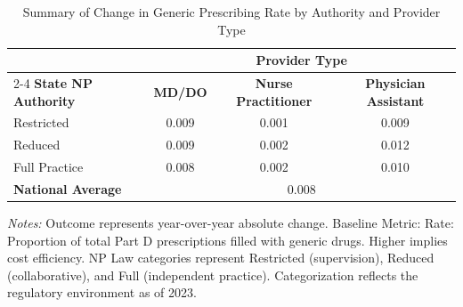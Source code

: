 \begin{table}[htbp]
    \centering
    \caption{Summary of Change in Generic Prescribing Rate by Authority and Provider Type}
    \label{tab:d_partd_generic_rate}
    \vspace{0.2cm}
    \begin{tabular}{lccc}
        \toprule
        & \multicolumn{3}{c}{\textbf{Provider Type}} \\
        \cmidrule(lr){2-4}
        \textbf{State NP Authority} & \textbf{MD/DO} & \textbf{Nurse Practitioner} & \textbf{Physician Assistant} \\
        \midrule
        Restricted & 0.009 & 0.001 & 0.009 \\
        Reduced & 0.009 & 0.002 & 0.012 \\
        Full Practice & 0.008 & 0.002 & 0.010 \\
        \midrule
        \textbf{National Average} & \multicolumn{3}{c}{0.008} \\
        \bottomrule
    \end{tabular}
    \vspace{0.1cm}
    \begin{minipage}{0.85\textwidth}
        \footnotesize \textit{Notes:} Outcome represents year-over-year absolute change. Baseline Metric: Rate: Proportion of total Part D prescriptions filled with generic drugs. Higher implies cost efficiency. NP Law categories represent Restricted (supervision), Reduced (collaborative), and Full (independent practice). Categorization reflects the regulatory environment as of 2023.
    \end{minipage}
\end{table}